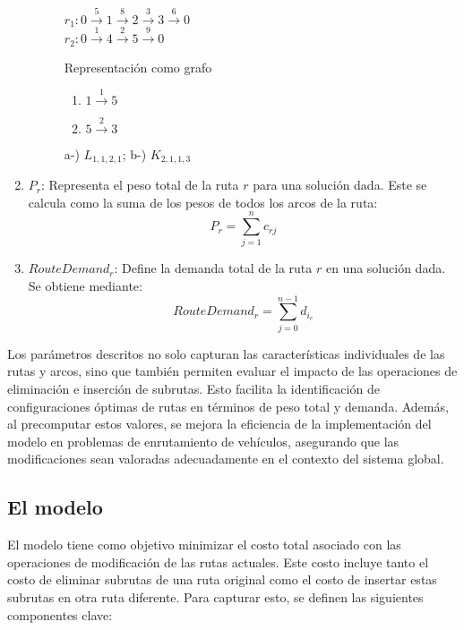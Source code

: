 \documentclass{article}
\begin{document}
\begin{enumerate}
\begin{figure}[h!] \vspace{0.5em} $r_1: 0 \overset{5}{\rightarrow} 1\overset{8}{\rightarrow} 2\overset{3}{\rightarrow} 3\overset{6}{\rightarrow} 0$\\
$r_2: 0\overset{1}{\rightarrow} 4\overset{2}{\rightarrow} 5\overset{9}{\rightarrow} 0$
\caption{Representación como grafo} 
\label{fig:parameter graph} 
\end{figure}

\begin{figure}[h!] 
\vspace{0.5em} 
\begin{enumerate} 
\item $1 \overset{1}{\rightarrow} 5 $ 
\item $5 \overset{2}{\rightarrow} 3 $ 
\end{enumerate} 
\caption{a-) $L_{1,1,2,1}$; b-) $K_{2,1,1,3}$}
 \label{fig:K-L examples} \end{figure}

\item{$P_r$: Representa el peso total de la ruta $r$ para una solución dada. Este se calcula como la suma de los pesos de todos los arcos de la ruta:}
  \[
P_r=\sum\limits_{j=1}^{n} c_{rj}  
\]

\item{$RouteDemand_r$: Define la demanda total de la ruta $r$ en una solución dada. Se obtiene mediante:}
\[
RouteDemand_r = \sum\limits_{j=0}^{n-1} d_{i_e}
\] 

\end{enumerate}

Los parámetros descritos no solo capturan las características individuales de las rutas y arcos, sino que también permiten evaluar el impacto de las operaciones de eliminación e inserción de subrutas. Esto facilita la identificación de configuraciones óptimas de rutas en términos de peso total y demanda. Además, al precomputar estos valores, se mejora la eficiencia de la implementación del modelo en problemas de enrutamiento de vehículos, asegurando que las modificaciones sean valoradas adecuadamente en el contexto del sistema global.

\subsection{El modelo}
El modelo tiene como objetivo minimizar el costo total asociado con las operaciones de modificación de las rutas actuales. Este costo incluye tanto el costo de eliminar subrutas de una ruta original como el costo de insertar estas subrutas en otra ruta diferente. Para capturar esto, se definen las siguientes componentes clave:
\end{document}
